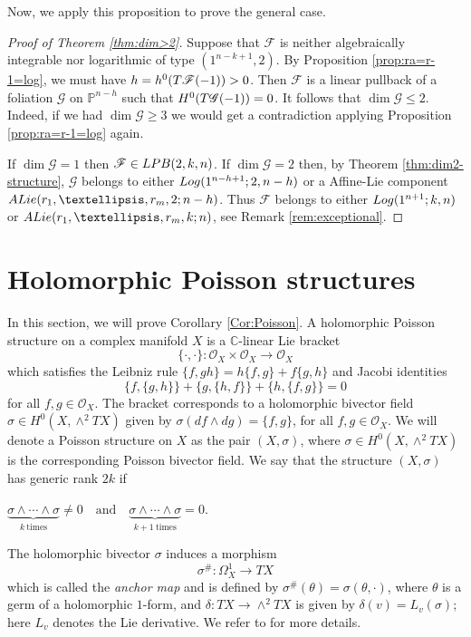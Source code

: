 \documentclass[twoside]{amsart}
\numberwithin{equation}{section}
\newcommand{\p}[1]{{\mathbb{P}^{#1}}}
\def\OO{\mathcal{O}}
\newcommand{\sF}{\mathscr{F}}
\newcommand{\sG}{\mathscr{G}}
\newcommand{\tF}{{\rm T}\sF}
\newcommand{\tG}{{\rm T}\sG}
\newcommand{\lpb}[3]{{\rm LPB }(#1,#2,#3)}
\newcommand{\logg}[3]{{\rm Log}(#1;#2,#3)}
\newcommand{\exc}[3]{{\rm ALie}(#1,#2;#3)}
\theoremstyle{definition}
\begin{document}
Now, we apply this proposition to prove the general case. 

\begin{proof}[Proof of Theorem \ref{thm:dim>2}]
Suppose that $\sF$ is neither algebraically integrable nor logarithmic of type $(1^{n-k+1},2)$. By Proposition \ref{prop:ra=r-1=log}, we must have $h = h^0(\tF(-1)) >0$. Then $\sF$ is a linear pullback of a foliation $\sG$ on $\p{n-h}$ such that $H^0(\tG(-1)) = 0$. It follows that $\dim \sG \leq 2$. Indeed, if we had $\dim \sG \geq 3$ we would get a contradiction applying Proposition \ref{prop:ra=r-1=log} again. 

If $\dim \sG = 1$ then $\sF \in \lpb{2}{k}{n}$. If $\dim \sG = 2$ then, by Theorem \ref{thm:dim2-structure}, $\sG$ belongs to either $\logg{1^{n-h+1}}{2}{n-h}$ or a Affine-Lie component $\exc{r_1, \dots,r_m}{2}{n-h}$. Thus $\sF$ belongs to either  $\logg{1^{n+1}}{k}{n}$ or $\exc{r_1, \dots,r_m}{k}{n}$, see Remark \ref{rem:exceptional}.
\end{proof}


\section{Holomorphic Poisson structures}\label{sectionPoisson}
In this section, we will prove Corollary \ref{Cor:Poisson}. A holomorphic Poisson structure on a complex manifold $X$ is a $\mathbb{C}$-linear Lie bracket 
$$\{ \cdot , \cdot \}\colon \OO_X \times \OO_X \to \OO_X$$ 
which satisfies the Leibniz rule $\{ f , gh \} = h \{f,g \} + f\{ g,h\}$ 
and Jacobi identities
$$\{f, \{g, h\}\} + \{g, \{h, f\}\} + \{h, \{f, g\}\} = 0$$
for all $f,g \in \OO_X$. The bracket corresponds to a holomorphic bivector field $\sigma \in H^0(X, \wedge^2 TX)$ given by
$\sigma(df \wedge dg) = \{f, g\}$, for all $f,g \in \OO_X$. 
We will denote a Poisson structure on $X$ as the pair $(X, \sigma)$, where $\sigma \in H^0(X, \wedge^2 TX)$ is the corresponding Poisson bivector field. We say that the structure $(X, \sigma)$ has generic rank $2k$ if 
\begin{center}
 $\underbrace{\sigma \wedge \cdots \wedge \sigma}_{k\ \mathrm{times}} \neq 0 \quad \text{and} \quad \underbrace{\sigma \wedge \cdots \wedge \sigma}_{k+1\ \mathrm{times}} = 0$. 
\end{center} 
The holomorphic bivector $\sigma$ induces a morphism
$$
\sigma^{\#}\colon \Omega_X^1 \to TX
$$
which is called the {\it anchor map} and is defined by $\sigma^{\#}(\theta) = \sigma(\theta,\cdot)$, where $\theta$ is a germ of a holomorphic $1$-form, and 
$\delta\colon TX \to \wedge^2 TX$ is given by $\delta(v) = L_v(\sigma)$; here $L_v$ denotes the Lie derivative. We refer to \cite{Pym3} for more details.
\end{document}
